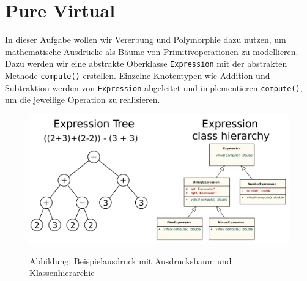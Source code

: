 \section{Pure Virtual}
In dieser Aufgabe wollen wir Vererbung und Polymorphie dazu nutzen, um mathematische Ausdrücke als Bäume von Primitivoperationen zu modellieren.
Dazu werden wir eine abstrakte Oberklasse \texttt{Expression} mit der abstrakten Methode \texttt{compute()} erstellen.
Einzelne Knotentypen wie Addition und Subtraktion werden von \texttt{Expression} abgeleitet und implementieren \texttt{compute()}, um die jeweilige Operation zu realisieren.
\begin{figure}[h]
\begin{center}
	\includegraphics[width=.75\textwidth]{figures/ExpressionTree.png}\\
	\caption{Abbildung: Beispielausdruck mit Ausdrucksbaum und Klassenhierarchie}
\end{center}
\end{figure}



